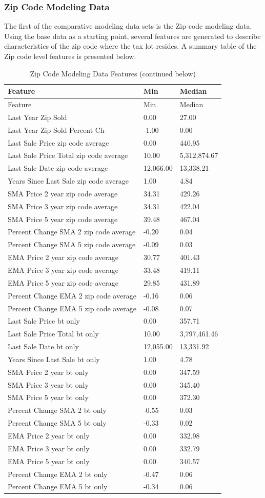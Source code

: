 \documentclass[12pt,]{article}
\begin{document}
\subsubsection{Zip Code Modeling Data}\label{zip-code-modeling-data}

The first of the comparative modeling data sets is the Zip code modeling
data. Using the base data as a starting point, several features are
generated to describe characteristics of the zip code where the tax lot
resides. A summary table of the Zip code level features is presented
below.

\begin{longtable}[]{@{}lll@{}}
\caption{Zip Code Modeling Data Features (continued
below)}\tabularnewline
\toprule
Feature & Min & Median\tabularnewline
\midrule
\endfirsthead
\toprule
Feature & Min & Median\tabularnewline
\midrule
\endhead
Last Year Zip Sold & 0.00 & 27.00\tabularnewline
Last Year Zip Sold Percent Ch & -1.00 & 0.00\tabularnewline
Last Sale Price zip code average & 0.00 & 440.95\tabularnewline
Last Sale Price Total zip code average & 10.00 &
5,312,874.67\tabularnewline
Last Sale Date zip code average & 12,066.00 & 13,338.21\tabularnewline
Years Since Last Sale zip code average & 1.00 & 4.84\tabularnewline
SMA Price 2 year zip code average & 34.31 & 429.26\tabularnewline
SMA Price 3 year zip code average & 34.31 & 422.04\tabularnewline
SMA Price 5 year zip code average & 39.48 & 467.04\tabularnewline
Percent Change SMA 2 zip code average & -0.20 & 0.04\tabularnewline
Percent Change SMA 5 zip code average & -0.09 & 0.03\tabularnewline
EMA Price 2 year zip code average & 30.77 & 401.43\tabularnewline
EMA Price 3 year zip code average & 33.48 & 419.11\tabularnewline
EMA Price 5 year zip code average & 29.85 & 431.89\tabularnewline
Percent Change EMA 2 zip code average & -0.16 & 0.06\tabularnewline
Percent Change EMA 5 zip code average & -0.08 & 0.07\tabularnewline
Last Sale Price bt only & 0.00 & 357.71\tabularnewline
Last Sale Price Total bt only & 10.00 & 3,797,461.46\tabularnewline
Last Sale Date bt only & 12,055.00 & 13,331.92\tabularnewline
Years Since Last Sale bt only & 1.00 & 4.78\tabularnewline
SMA Price 2 year bt only & 0.00 & 347.59\tabularnewline
SMA Price 3 year bt only & 0.00 & 345.40\tabularnewline
SMA Price 5 year bt only & 0.00 & 372.30\tabularnewline
Percent Change SMA 2 bt only & -0.55 & 0.03\tabularnewline
Percent Change SMA 5 bt only & -0.33 & 0.02\tabularnewline
EMA Price 2 year bt only & 0.00 & 332.98\tabularnewline
EMA Price 3 year bt only & 0.00 & 332.79\tabularnewline
EMA Price 5 year bt only & 0.00 & 340.57\tabularnewline
Percent Change EMA 2 bt only & -0.47 & 0.06\tabularnewline
Percent Change EMA 5 bt only & -0.34 & 0.06\tabularnewline
\bottomrule
\end{longtable}
\end{document}
